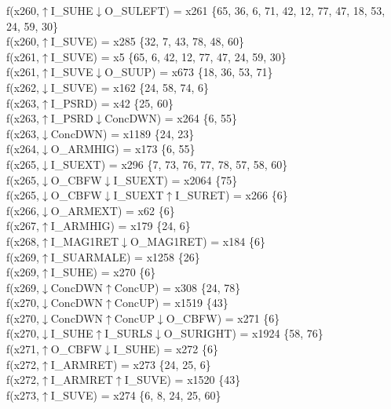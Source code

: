 f(x260,$\uparrow$I\_SUHE$\downarrow$O\_SULEFT) = x261 \{65, 36, 6, 71, 42, 12, 77, 47, 18, 53, 24, 59, 30\} \\  
f(x260,$\uparrow$I\_SUVE) = x285 \{32, 7, 43, 78, 48, 60\} \\  
f(x261,$\uparrow$I\_SUVE) = x5 \{65, 6, 42, 12, 77, 47, 24, 59, 30\} \\  
f(x261,$\uparrow$I\_SUVE$\downarrow$O\_SUUP) = x673 \{18, 36, 53, 71\} \\  
f(x262,$\downarrow$I\_SUVE) = x162 \{24, 58, 74, 6\} \\  
f(x263,$\uparrow$I\_PSRD) = x42 \{25, 60\} \\  
f(x263,$\uparrow$I\_PSRD$\downarrow$ConcDWN) = x264 \{6, 55\} \\  
f(x263,$\downarrow$ConcDWN) = x1189 \{24, 23\} \\  
f(x264,$\downarrow$O\_ARMHIG) = x173 \{6, 55\} \\  
f(x265,$\downarrow$I\_SUEXT) = x296 \{7, 73, 76, 77, 78, 57, 58, 60\} \\  
f(x265,$\downarrow$O\_CBFW$\downarrow$I\_SUEXT) = x2064 \{75\} \\  
f(x265,$\downarrow$O\_CBFW$\downarrow$I\_SUEXT$\uparrow$I\_SURET) = x266 \{6\} \\  
f(x266,$\downarrow$O\_ARMEXT) = x62 \{6\} \\  
f(x267,$\uparrow$I\_ARMHIG) = x179 \{24, 6\} \\  
f(x268,$\uparrow$I\_MAG1RET$\downarrow$O\_MAG1RET) = x184 \{6\} \\  
f(x269,$\uparrow$I\_SUARMALE) = x1258 \{26\} \\  
f(x269,$\uparrow$I\_SUHE) = x270 \{6\} \\  
f(x269,$\downarrow$ConcDWN$\uparrow$ConcUP) = x308 \{24, 78\} \\  
f(x270,$\downarrow$ConcDWN$\uparrow$ConcUP) = x1519 \{43\} \\  
f(x270,$\downarrow$ConcDWN$\uparrow$ConcUP$\downarrow$O\_CBFW) = x271 \{6\} \\  
f(x270,$\downarrow$I\_SUHE$\uparrow$I\_SURLS$\downarrow$O\_SURIGHT) = x1924 \{58, 76\} \\  
f(x271,$\uparrow$O\_CBFW$\downarrow$I\_SUHE) = x272 \{6\} \\  
f(x272,$\uparrow$I\_ARMRET) = x273 \{24, 25, 6\} \\  
f(x272,$\uparrow$I\_ARMRET$\uparrow$I\_SUVE) = x1520 \{43\} \\  
f(x273,$\uparrow$I\_SUVE) = x274 \{6, 8, 24, 25, 60\} \\  
